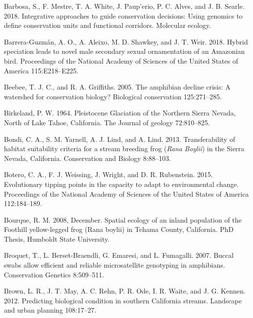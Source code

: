 \documentclass[proquest,12pt,final]{ucthesis-CA2012} %
\begin{document}
\begin{ucmainmatter}
\leavevmode\hypertarget{ref-barbosa_integrative_2018}{}%
Barbosa, S., F. Mestre, T. A. White, J. Paup\a'erio, P. C. Alves, and J.
B. Searle. 2018. Integrative approaches to guide conservation decisions:
Using genomics to define conservation units and functional corridors.
Molecular ecology.

\leavevmode\hypertarget{ref-barrera-guzman_hybrid_2018}{}%
Barrera-Guzmán, A. O., A. Aleixo, M. D. Shawkey, and J. T. Weir. 2018.
Hybrid speciation leads to novel male secondary sexual ornamentation of
an Amazonian bird. Proceedings of the National Academy of Sciences of
the United States of America 115:E218--E225.

\leavevmode\hypertarget{ref-beebee_amphibian_2005}{}%
Beebee, T. J. C., and R. A. Griffiths. 2005. The amphibian decline
crisis: A watershed for conservation biology? Biological conservation
125:271--285.

\leavevmode\hypertarget{ref-birkeland_pleistocene_1964}{}%
Birkeland, P. W. 1964. Pleistocene Glaciation of the Northern Sierra
Nevada, North of Lake Tahoe, California. The Journal of geology
72:810--825.

\leavevmode\hypertarget{ref-bondi_transferability_2013}{}%
Bondi, C. A., S. M. Yarnell, A. J. Lind, and A. Lind. 2013.
Transferability of habitat suitability criteria for a stream breeding
frog (\emph{Rana} \emph{Boylii}) in the Sierra Nevada, California.
Conservation and Biology 8:88--103.

\leavevmode\hypertarget{ref-botero_evolutionary_2015}{}%
Botero, C. A., F. J. Weissing, J. Wright, and D. R. Rubenstein. 2015.
Evolutionary tipping points in the capacity to adapt to environmental
change. Proceedings of the National Academy of Sciences of the United
States of America 112:184--189.

\leavevmode\hypertarget{ref-bourque_spatial_2008}{}%
Bourque, R. M. 2008, December. Spatial ecology of an inland population
of the Foothill yellow-legged frog (Rana boylii) in Tehama County,
California. PhD Thesis, Humboldt State University.

\leavevmode\hypertarget{ref-broquet_buccal_2007}{}%
Broquet, T., L. Berset-Braendli, G. Emaresi, and L. Fumagalli. 2007.
Buccal swabs allow efficient and reliable microsatellite genotyping in
amphibians. Conservation Genetics 8:509--511.

\leavevmode\hypertarget{ref-brown_predicting_2012}{}%
Brown, L. R., J. T. May, A. C. Rehn, P. R. Ode, I. R. Waite, and J. G.
Kennen. 2012. Predicting biological condition in southern California
streams. Landscape and urban planning 108:17--27.


\end{ucmainmatter}
\end{document}
